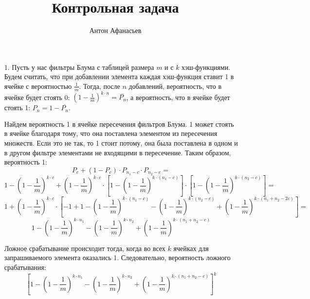 \documentclass[10pt]{article}
\renewcommand{\P}[1]{\left ( 1 - \frac{1}{m} \right ) ^ {k \cdot #1} }
\renewcommand{\not}{\overline}
\begin{document}
\title{Контрольная задача}
\author{Антон Афанасьев}
\maketitle

\begin{enumerate}
\item[1.]
	Пусть у нас фильтры Блума с таблицей размера $m$ и с $k$ хэш-функциями. Будем считать, что при добавлении элемента каждая хэш-функция ставит 1 в ячейке с вероятностью $\frac{1}{m}$. Тогда, после $n$ добавлений, вероятность, что в ячейке будет стоять 0: $\P{n} = \not{P_n}$, а вероятность, что в ячейке будет стоять 1: $P_n = 1 - \not{P_n}$.
	
	Найдем вероятность 1 в ячейке пересечения фильтров Блума. 1 может стоять в ячейке благодаря тому, что она поставлена элементом из пересечения множеств. Если это не так, то 1 стоит потому, она была поставлена в одном и в другом фильтре элементами не входящими в пересечение. Таким образом, вероятность 1:
	$$P_c + (1 - P_c) \cdot P_{n_1 - c} \cdot P_{n_2 - c}=$$
	$$1 - \P{c} + \P{c} \cdot \left [ 1 - \P{(n_1-c)} \right ] \cdot \left [ 1 - \P{(n_2-c)} \right ] =$$
	$$1 + \P{c} \cdot \left [ -1 + 1 - \P{(n_1 - c)} - \P{(n_2-c)} + \P{(n_1 + n_2 - 2c)} \right ] = $$
	$$1 - \P{n_1} - \P{n_2} + \P{(n_1 + n_2 - c)}$$
	
	Ложное срабатывание происходит тогда, когда во всех $k$ ячейках для запрашиваемого элемента оказались 1. Следовательно, вероятность ложного срабатывания:
	$$\left [ 1 - \P{n_1} - \P{n_2} + \P{(n_1 + n_2 - c)} \right ] ^k$$
\end{enumerate}
\end{document}
